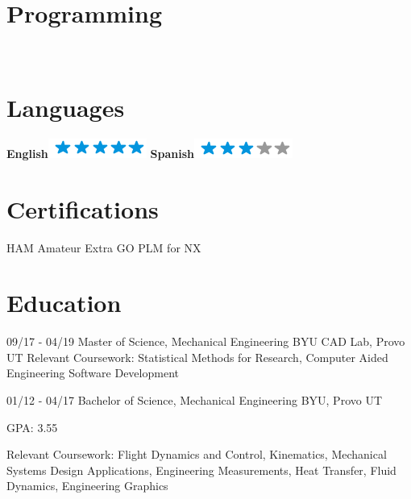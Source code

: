 \documentclass[]{friggeri-cv}
\begin{document}
\begin{aside}
    \section{Programming}
    ~
    \section{Languages}
    \textbf{English}\includegraphics[scale=0.40]{img/5stars.png}
    \textbf{Spanish}\includegraphics[scale=0.40]{img/3stars.png}
    ~
    \section{Certifications}
    HAM Amateur Extra
    GO PLM for NX
    ~
\end{aside}

\section{Education}
\begin{entrylist}
    \entry
    {09/17 - 04/19}
    {Master of Science, Mechanical Engineering}
    {BYU CAD Lab, Provo UT}
    {Relevant Coursework: Statistical Methods for Research, Computer Aided Engineering Software Development}

    \entry
    {01/12 - 04/17}
    {Bachelor of Science, Mechanical Engineering}
    {BYU, Provo UT}
    {GPA: 3.55

    Relevant Coursework: Flight Dynamics and Control, Kinematics, Mechanical Systems Design Applications, Engineering Measurements, Heat Transfer, Fluid Dynamics, Engineering Graphics}



\end{entrylist}
\end{document}
